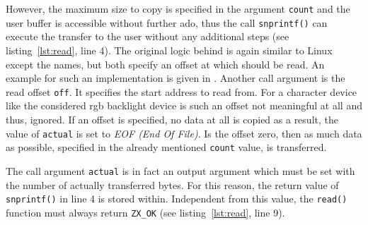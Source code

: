 However, the maximum size to copy is specified in the argument \texttt{count} and the user buffer is accessible without further ado, thus the call \texttt{snprintf()} can execute the transfer to the user without any additional steps (see listing~\ref{lst:read}, line 4).
The original logic behind is again similar to Linux except the names, but both specify an offset at which should be read.
An example for such an implementation is given in \cite{zircon-simpledrv}.
Another call argument is the read offset \texttt{off}.
It specifies the start address to read from.
For a character device like the considered \ac{rgb} backlight device is such an offset not meaningful at all and thus, ignored.
If an offset is specified, no data at all is copied as a result, the value of \texttt{actual} is set to \textit{EOF (End Of File)}.
Is the offset zero, then as much data as possible, specified in the already mentioned \texttt{count} value, is transferred.
%

The call argument \texttt{actual} is in fact an output argument which must be set with the number of actually transferred bytes.
For this reason, the return value of \texttt{snprintf()} in line 4 is stored within.
Independent from this value, the \texttt{read()} function must always return \texttt{ZX_OK} (see listing~\ref{lst:read}, line 9).

